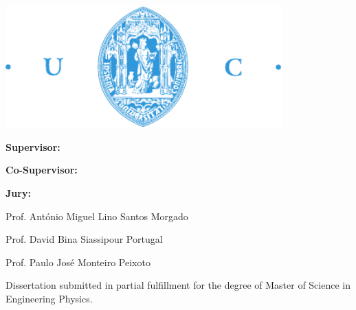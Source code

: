 \begin{titlepage}
\begin{center}
\includegraphics[width=0.8\textwidth]{images/fctuc.pdf}

\vspace{1cm}
{\huge{\textbf{\thesistitle}}\par}

\vspace{1cm}
{\large{\textbf{Supervisor:}\\\supervisorname\par}}
\vspace{5mm}
{\large{\textbf{Co-Supervisor:}\\\cosupervisorname}}

\vspace{1cm}
{\large{\textbf{Jury:}

Prof. António Miguel Lino Santos Morgado

Prof. David Bina Siassipour Portugal 

Prof. Paulo José Monteiro Peixoto 

}}

\vfill
Dissertation submitted in partial fulfillment for the degree of Master of Science in Engineering Physics.

\vspace{0.5cm}
{\large \statedate\par}    


\end{center}
\end{titlepage}
